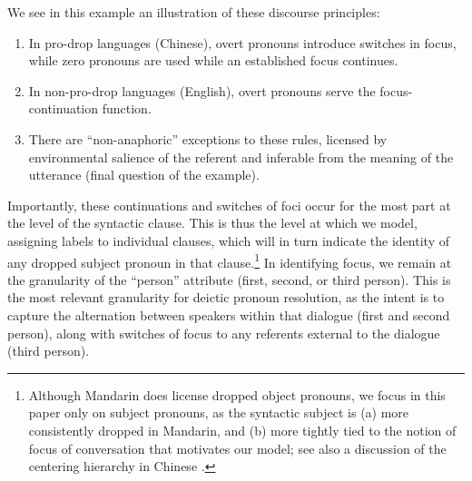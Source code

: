 \documentclass[11pt]{report}
\begin{document}
We see in this example an illustration of these discourse principles:
\begin{enumerate} \itemsep1pt \parskip0pt 
\item In pro-drop languages (Chinese), overt pronouns introduce switches in focus, while zero pronouns are used while an established focus continues.
\item In non-pro-drop languages (English), overt pronouns serve the focus-continuation function.
\item There are  ``non-anaphoric'' exceptions to these rules, licensed by environmental salience of the referent and inferable from the meaning of the utterance (final question of the example).
\end{enumerate}

Importantly, these continuations and switches of foci occur for the most part at the level of the syntactic clause. This is thus the level at which we model, assigning labels to individual clauses, which will in turn indicate the identity of any dropped subject pronoun in that clause.\footnote{Although Mandarin does license dropped object pronouns, we focus in this paper only on subject pronouns, as the syntactic subject is (a) more consistently dropped in Mandarin, and (b) more tightly tied to the notion of focus of conversation that motivates our model; see also a discussion of the centering hierarchy in Chinese \cite{chincent}.} In identifying focus, we remain at the granularity of the ``person'' attribute (first, second, or third person). This is the most relevant granularity for deictic pronoun resolution, as the intent is to capture the alternation between speakers within that dialogue (first and second person), along with switches of focus to any referents external to the dialogue (third person). %
\end{document}

